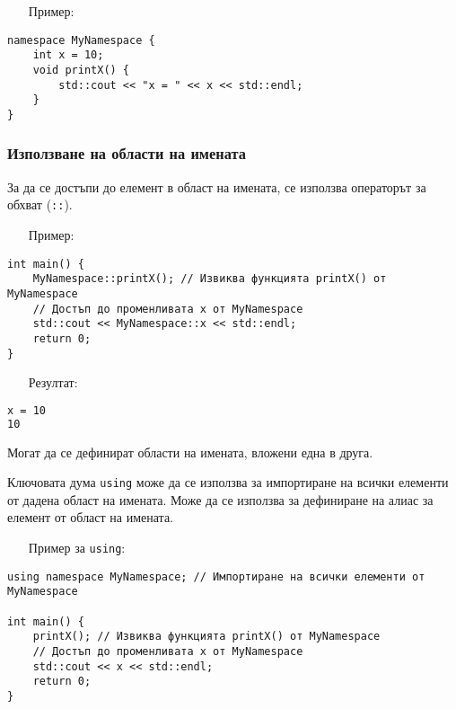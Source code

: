 \documentclass[oneside]{book}
\newcommand*{\code}[1]{\texttt{#1}}
\begin{document}
\begin{itemize}\item[Пример:]\end{itemize}
\begin{mdframed}\begin{lstlisting}
namespace MyNamespace {
    int x = 10;
    void printX() {
        std::cout << "x = " << x << std::endl;
    }
}
\end{lstlisting}\end{mdframed}

\subsubsection{Използване на области на имената}
За да се достъпи до елемент в област на имената, се използва операторът за обхват (\code{::}).
\pagebreak
\begin{itemize}\item[Пример:]\end{itemize}
\begin{mdframed}\begin{lstlisting}
int main() {
    MyNamespace::printX(); // Извиква функцията printX() от MyNamespace
    // Достъп до променливата x от MyNamespace
    std::cout << MyNamespace::x << std::endl;
    return 0;
}
\end{lstlisting}\end{mdframed}

\begin{itemize}\item[Резултат:]\end{itemize}
\begin{mdframed}\begin{lstlisting}[language=bash]
x = 10
10
\end{lstlisting}\end{mdframed}

Могат да се дефинират области на имената, вложени една в друга.

Ключовата дума \code{using} може да се използва за импортиране на всички елементи от дадена област на имената.
Може да се използва за дефиниране на алиас за елемент от област на имената.

\begin{itemize}\item[Пример] за \code{using}:\end{itemize}
\begin{mdframed}\begin{lstlisting}
using namespace MyNamespace; // Импортиране на всички елементи от MyNamespace

int main() {
    printX(); // Извиква функцията printX() от MyNamespace
    // Достъп до променливата x от MyNamespace
    std::cout << x << std::endl;
    return 0;
}
\end{lstlisting}\end{mdframed}
\end{document}
